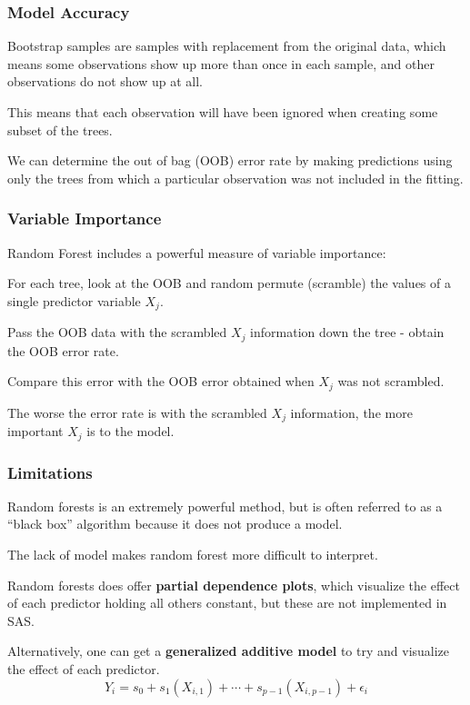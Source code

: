 \documentclass[12pt]{../notes}
\begin{document}
\subsubsection{Model Accuracy}
\bi
\item Bootstrap samples are samples with replacement from the original data, which means some observations show up more than once in each sample, and other observations do not show up at all. 
\item This means that each observation will have been ignored when creating some subset of the trees. 
\item We can determine the out of bag (OOB) error rate by making predictions using only the trees from which a particular observation was not included in the fitting. 
\ei

\subsubsection{Variable Importance}
Random Forest includes a powerful measure of variable importance:
\bi
\item For each tree, look at the OOB and random permute (scramble) the values of a single predictor variable $X_j$.
\item Pass the OOB data with the scrambled $X_j$ information down the tree - obtain the OOB error rate. 
\item Compare this error with the OOB error obtained when $X_j$ was not scrambled. 
\item The worse the error rate is with the scrambled $X_j$ information, the more important $X_j$ is to the model. 
\ei


\subsubsection{Limitations}
\bi
\item Random forests is an extremely powerful method, but is often referred to as a ``black box'' algorithm because it does not produce a model. 
\item The lack of model makes random forest more difficult to interpret. 
\item Random forests does offer \textbf{partial dependence plots}, which visualize the effect of each predictor holding all others constant, but these are not implemented in SAS. 
\item Alternatively, one can get a \textbf{generalized additive model} to try and visualize the effect of each predictor. 
$$Y_i = s_0 + s_1\left(X_{i, 1}\right) + \cdots + s_{p-1}\left(X_{i, p-1}\right) + \epsilon_i$$
\ei
\end{document}
